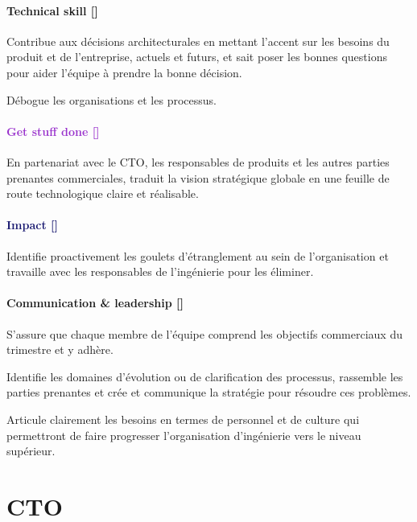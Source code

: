 \documentclass[a4paper, french, openany, 12pt]{book}
\newcommand\dex{\textcolor{BrickRed}{\textbf{Technical skill [\bsc{DEX}]}}}
\newcommand\str{\textcolor{DarkOrchid}{\textbf{Get stuff done [\bsc{STR}]}}}
\newcommand\wis{\textcolor{MidnightBlue}{\textbf{Impact [\bsc{WIS}]}}}
\newcommand\cha{\textcolor{RawSienna}{\textbf{Communication \& leadership [\bsc{CHA}]}}}
\begin{document}
\begin{multicols}{2}

  \subsubsection*{\dex}
  Contribue aux décisions architecturales en mettant l'accent sur les besoins du produit et de l'entreprise,
  actuels et futurs, et sait poser les bonnes questions pour aider l'équipe à prendre la bonne décision.

  Débogue les organisations et les processus.

  \subsubsection*{\str}

  En partenariat avec le CTO, les responsables de produits et les autres parties prenantes commerciales, 
  traduit la vision stratégique globale en une feuille de route technologique claire et réalisable.

  \subsubsection*{\wis}

  Identifie proactivement les goulets d'étranglement au sein de l'organisation et travaille avec les
  responsables de l'ingénierie pour les éliminer.

  \subsubsection*{\cha}

  S'assure que chaque membre de l'équipe comprend les objectifs commerciaux du trimestre et y adhère.

  Identifie les domaines d'évolution ou de clarification des processus, rassemble les parties prenantes et crée et 
  communique la stratégie pour résoudre ces problèmes.

  Articule clairement les besoins en termes de personnel et de culture qui permettront de faire progresser l'organisation
  d'ingénierie vers le niveau supérieur.

\end{multicols}

\chapter{CTO}
\end{document}
